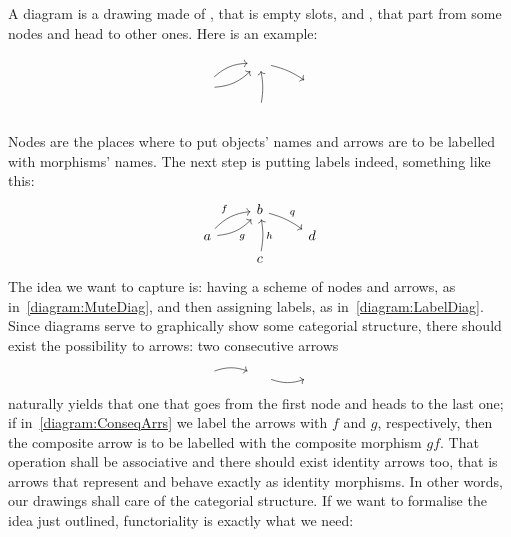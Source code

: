 A diagram is a drawing made of , that is empty slots, and
, that part from some nodes and head to other ones. Here is
an example:
\begin{equation}\begin{tikzcd}[row sep=tiny]
    & \phantom\square \ar[dr, bend left=10] \\
    \phantom\square \ar[ur, bend left=20] \ar[ur, bend right=20, swap] & & \phantom\square  \\
    & \phantom\square \ar[uu, bend right=10, swap]
  \end{tikzcd}\label{diagram:MuteDiag}\end{equation}
%
Nodes are the places where to put objects' names and arrows are to be
labelled with morphisms' names. The next step is putting labels
indeed, something like this:
\begin{equation}
  \begin{tikzcd}[row sep=tiny]
    & b \ar["q", dr, bend left=10] \\
    a \arrow["f", ur, bend left=20] \arrow["g", ur, bend right=20, swap] & & d  \\
    & c \arrow["h", uu, bend right=10, swap]
  \end{tikzcd}
  \label{diagram:LabelDiag}
\end{equation}
%
The idea we want to capture is: having a scheme of nodes and arrows,
as in~\eqref{diagram:MuteDiag}, and then assigning labels, as
in~\eqref{diagram:LabelDiag}. Since diagrams serve to graphically show
some categorial structure, there should exist the possibility to
 arrows: two consecutive arrows
\begin{equation}
  \begin{tikzcd}
    \phantom\square \ar[r, bend left=20] & \phantom\square \ar[r, swap, bend
    right=20] & \phantom\square
  \end{tikzcd}
  \label{diagram:ConseqArrs}
\end{equation}
naturally yields that one that goes from the first node and heads to
the last one; if in~\eqref{diagram:ConseqArrs} we label the arrows
with \(f\) and \(g\), respectively, then the composite arrow is to be
labelled with the composite morphism \(gf\). That operation shall be
associative and there should exist identity arrows too, that is arrows
that represent and behave exactly as identity morphisms. In other
words, our drawings shall care of the categorial structure. If we want
to formalise the idea just outlined, functoriality is exactly what we
need:

